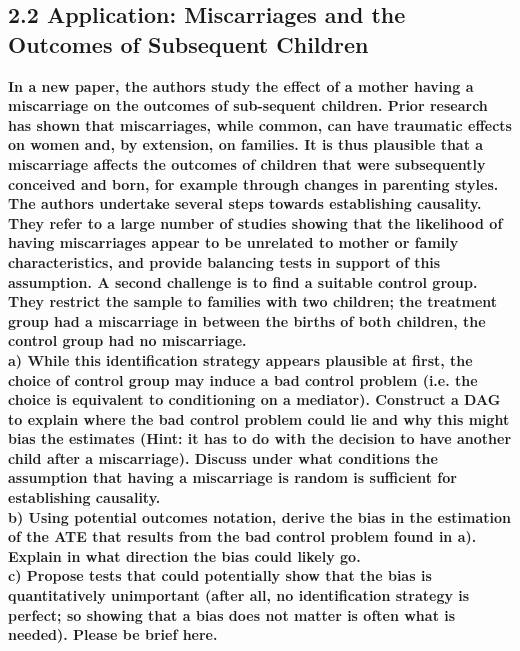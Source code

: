 \documentclass[a4paper,12pt,oneside,English]{article}
\begin{document}
\subsection{2.2 
Application: Miscarriages and the Outcomes of Subsequent Children}
\textbf{In a new paper, the authors study the effect of a mother having a miscarriage on the outcomes of sub-sequent children. Prior research has shown that miscarriages, while common, can have traumatic effects on women and, by extension, on families. It is thus plausible that a miscarriage affects the outcomes of children that were subsequently conceived and born, for example through changes in parenting styles.
The authors undertake several steps towards establishing causality. They refer to a large number of studies showing that the likelihood of having miscarriages appear to be unrelated to mother or family characteristics, and provide balancing tests in support of this assumption. A second challenge is to find a suitable control group. They restrict the sample to families with two children; the treatment group had a miscarriage in between the births of both children, the control group had no miscarriage.}\\
\textbf{a) While this identification strategy appears plausible at first, the choice of control group may induce a bad control problem (i.e. the choice is equivalent to conditioning on a mediator). Construct a DAG to explain where the bad control problem could lie and why this might bias the estimates (Hint: it has to do with the decision to have another child after a miscarriage). Discuss under what conditions the assumption that having a miscarriage is random is sufficient for establishing causality.}\\
\textbf{b) Using potential outcomes notation, derive the bias in the estimation of the ATE that results from the bad control problem found in a). Explain in what direction the bias could likely go.}\\
\textbf{c) Propose tests that could potentially show that the bias is quantitatively unimportant (after all, no identification strategy is perfect; so showing that a bias does not matter is often what is needed). Please be brief here.}\\
\end{document}
